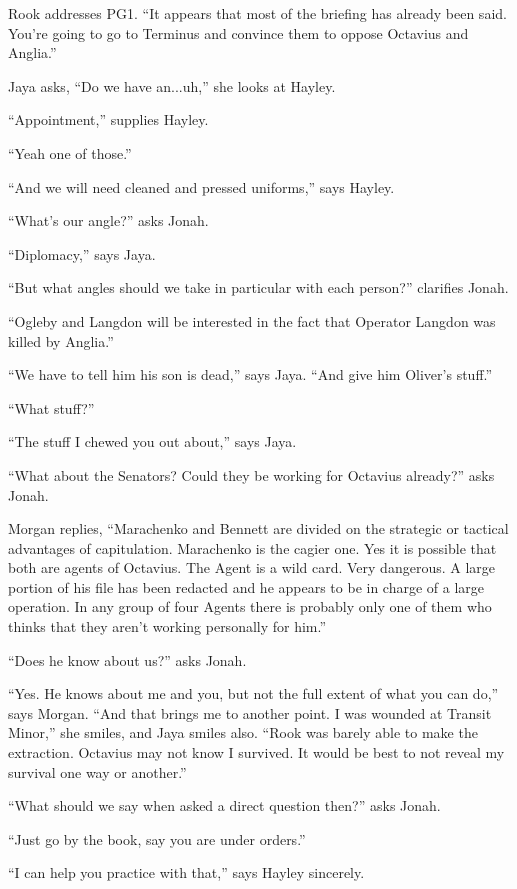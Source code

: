 Rook addresses PG1. ``It appears that most of the briefing has already been said.  You're going to go to Terminus and convince them to oppose Octavius and Anglia.''

Jaya asks, ``Do we have an...uh,'' she looks at Hayley.

``Appointment,'' supplies Hayley.

``Yeah one of those.''

``And we will need cleaned and pressed uniforms,'' says Hayley.

``What's our angle?'' asks Jonah.

``Diplomacy,'' says Jaya.

``But what angles should we take in particular with each person?'' clarifies Jonah.

``Ogleby and Langdon will be interested in the fact that Operator Langdon was killed by Anglia.''

``We have to tell him his son is dead,'' says Jaya.  ``And give him Oliver's stuff.''

``What stuff?''

``The stuff I chewed you out about,'' says Jaya.

``What about the Senators?  Could they be working for Octavius already?'' asks Jonah.

Morgan replies, ``Marachenko and Bennett are divided on the strategic or tactical advantages of capitulation.  Marachenko is the cagier one.  Yes it is possible that both are agents of Octavius.  The Agent is a wild card. Very dangerous.  A large portion of his file has been redacted and he appears to be in charge of a large operation.  In any group of four Agents there is probably only one of them who thinks that they aren't working personally for him.''

``Does he know about us?'' asks Jonah.

``Yes.  He knows about me and you, but not the full extent of what you can do,'' says Morgan.  ``And that brings me to another point.  I was wounded at Transit Minor,'' she smiles, and Jaya smiles also.  ``Rook was barely able to make the extraction.  Octavius may not know I survived.  It would be best to not reveal my survival one way or another.''

``What should we say when asked a direct question then?'' asks Jonah.

``Just go by the book, say you are under orders.''

``I can help you practice with that,'' says Hayley sincerely.

